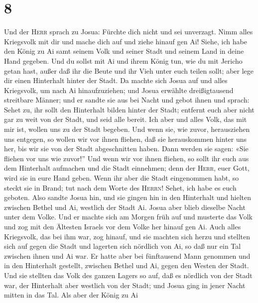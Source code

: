 \hypertarget{section-7}{%
\section{8}\label{section-7}}

 Und der \textsc{Herr} sprach zu Josua: Fürchte dich nicht
und sei unverzagt. Nimm alles Kriegsvolk mit dir und mache dich auf und
ziehe hinauf gen Ai! Siehe, ich habe den König zu Ai samt seinem Volk
und seiner Stadt und seinem Land in deine Hand gegeben. 
Und du sollst mit Ai und ihrem König tun, wie du mit Jericho getan hast,
außer daß ihr die Beute und ihr Vieh unter euch teilen sollt; aber lege
dir einen Hinterhalt hinter der Stadt.  Da machte sich
Josua auf und alles Kriegsvolk, um nach Ai hinaufzuziehen; und Josua
erwählte dreißigtausend streitbare Männer; und er sandte sie aus bei
Nacht  und gebot ihnen und sprach: Sehet zu, ihr sollt den
Hinterhalt bilden hinter der Stadt; entfernt euch aber nicht gar zu weit
von der Stadt, und seid alle bereit.  Ich aber und alles
Volk, das mit mir ist, wollen uns zu der Stadt begeben. Und wenn sie,
wie zuvor, herausziehen uns entgegen, so wollen wir vor ihnen fliehen,
 daß sie herauskommen hinter uns her, bis wir sie von der
Stadt abgeschnitten haben. Dann werden sie sagen: «Sie fliehen vor uns
wie zuvor!''  Und wenn wir vor ihnen fliehen, so sollt ihr
euch aus dem Hinterhalt aufmachen und die Stadt einnehmen; denn der
\textsc{Herr}, euer Gott, wird sie in eure Hand geben. 
Wenn ihr aber die Stadt eingenommen habt, so steckt sie in Brand; tut
nach dem Worte des \textsc{Herrn}! Sehet, ich habe es euch geboten.
 Also sandte Josua hin, und sie gingen hin in den
Hinterhalt und hielten zwischen Bethel und Ai, westlich der Stadt Ai.
Josua aber blieb dieselbe Nacht unter dem Volke.  Und er
machte sich am Morgen früh auf und musterte das Volk und zog mit den
Ältesten Israels vor dem Volke her hinauf gen Ai.  Auch
alles Kriegsvolk, das bei ihm war, zog hinauf, und sie machten sich
herzu und stellten sich auf gegen die Stadt und lagerten sich nördlich
von Ai, so daß nur ein Tal zwischen ihnen und Ai war.  Er
hatte aber bei fünftausend Mann genommen und in den Hinterhalt gestellt,
zwischen Bethel und Ai, gegen den Westen der Stadt.  Und
sie stellten das Volk des ganzen Lagers so auf, daß es nördlich von der
Stadt war, der Hinterhalt aber westlich von der Stadt; und Josua ging in
jener Nacht mitten in das Tal.  Als aber der König zu Ai
